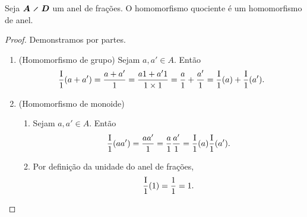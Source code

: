 \begin{proposition}
Seja $\bm{A \olddiv D}$ um anel de frações. O homomorfismo quociente é um homomorfismo de anel.
\end{proposition}
\begin{proof}Demonstramos por partes.
	\begin{enumerate}
	\item (Homomorfismo de grupo) Sejam $a,a' \in A$. Então
		\begin{equation*}
		\frac{\mathrm{I}}{1}(a+a') = \frac{a+a'}{1} = \frac{a1+a'1}{1 \times 1} = \frac{a}{1} + \frac{a'}{1} = \frac{\mathrm{I}}{1}(a) + \frac{\mathrm{I}}{1}(a').
		\end{equation*}

	\item (Homomorfismo de monoide)
		\begin{enumerate}
		\item Sejam $a,a' \in A$. Então
		\begin{equation*}
		\frac{\mathrm{I}}{1}(aa') = \frac{aa'}{1} = \frac{a}{1}\frac{a'}{1} = \frac{\mathrm{I}}{1}(a)\frac{\mathrm{I}}{1}(a').
		\end{equation*}

		\item Por definição da unidade do anel de frações,
			\begin{equation*}
			\frac{\mathrm{I}}{1}(1) = \frac{1}{1} = 1.
			\end{equation*}
		\end{enumerate}
	\end{enumerate}
\end{proof}

